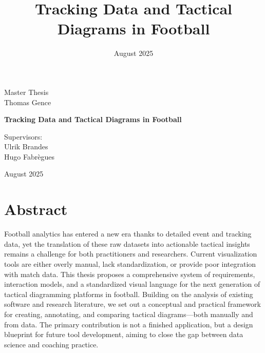 \documentclass[11pt,a4paper,openright]{report}
\newcommand{\thesistype}[1]{\def\thesistype{#1}}
\newcommand{\advisors}[1]{\def\advisors{#1}}
\begin{document}
\title{Tracking Data and Tactical Diagrams in Football}
\thesistype{Master Thesis}
\advisors{Supervisors:\\
		Ulrik Brandes\\
		Hugo Fabrègues\\[5mm]}
\date{August 2025}

\begin{titlepage}
    \centering
    \strut\vspace{4cm}
    {\fontsize{25pt}{29pt}\selectfont Master Thesis \\[6mm]
    Thomas Gence\\[10mm]}
    \vspace{2cm}
    {\fontsize{30pt}{34pt}\selectfont \bfseries Tracking Data and Tactical Diagrams in Football \par}
    \vspace{3cm}
    {\fontsize{18pt}{22pt}\selectfont \advisors \par}
    \vspace{0.5cm}
    {\fontsize{16pt}{20pt}\selectfont August 2025 \par} 
    \vfill
\end{titlepage}

\newpage
{}

\chapter*{Abstract}
Football analytics has entered a new era thanks to detailed event and tracking data, yet the translation of these raw datasets into actionable tactical insights remains a challenge for both practitioners and researchers. Current visualization tools are either overly manual, lack standardization, or provide poor integration with match data. This thesis proposes a comprehensive system of requirements, interaction models, and a standardized visual language for the next generation of tactical diagramming platforms in football. Building on the analysis of existing software and research literature, we set out a conceptual and practical framework for creating, annotating, and comparing tactical diagrams—both manually and from data. The primary contribution is not a finished application, but a design blueprint for future tool development, aiming to close the gap between data science and coaching practice.
\end{document}
